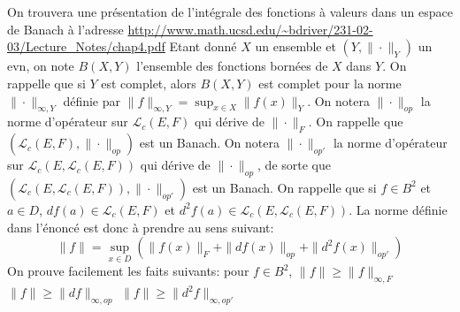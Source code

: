 \documentclass{report}
\begin{document}
\subsection{} \noindent{}\\ 
\\ 
\\
\noindent On trouvera une présentation de l'intégrale des fonctions à valeurs dans un espace de Banach à l'adresse \newline  \url{http://www.math.ucsd.edu/~bdriver/231-02-03/Lecture_Notes/chap4.pdf} \newline \newline 
Etant donné $X$ un ensemble et $(Y,\|\cdot\|_Y)$ un evn, on note $B(X,Y)$ l'ensemble des fonctions bornées de $X$ dans $Y$. On rappelle que si $Y$ est complet, alors $B(X,Y)$ est complet pour la norme $\|\cdot\|_{\infty,Y}$ définie par $\|f\|_{\infty,Y}=\sup_{x\in X}\|f(x)\|_Y$.\newline \newline
On notera $\|\cdot\|_{op}$ la norme d'opérateur sur $\mathcal L_c(E,F)$ qui dérive de $\|\cdot\|_F$. On rappelle que $(\mathcal L_c(E,F),\|\cdot\|_{op})$ est un Banach.\newline \newline
On notera $\|\cdot\|_{op'}$ la norme d'opérateur sur $\mathcal L_c(E,\mathcal L_c(E,F))$ qui dérive de $\|\cdot\|_{op}$, de sorte que $(\mathcal L_c(E,\mathcal L_c(E,F)),\|\cdot\|_{op'})$ est un Banach.\newline \newline
On rappelle que si $f\in B^2$ et $a\in D$, $df(a)\in \mathcal L_c(E,F)$ et $d^2f(a) \in \mathcal L_c(E,\mathcal L_c(E,F))$. La norme définie dans l'énoncé est donc à prendre au sens suivant: $$\|f\| = \sup_{x\in D}( \|f(x)\|_F + \|df(x)\|_{op} + \|d^2f(x)\|_{op'})$$ 
On prouve facilement les faits suivants: pour $f\in B^2$, \newline
$\|f\|\geq \|f\|_{\infty, F}$ \newline
$\|f\|\geq \|df\|_{\infty, op}$ \newline
$\|f\|\geq \|d^2f\|_{\infty, op'}$ \newline 
\end{document}
